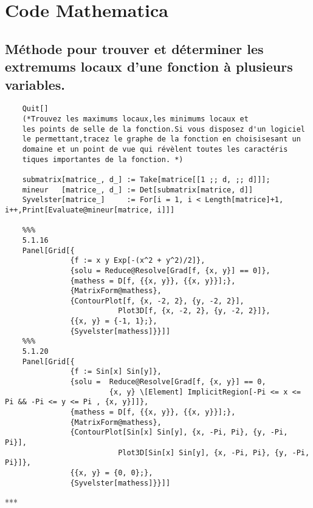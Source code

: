 \section{Code Mathematica}
\subsection{Méthode pour trouver et déterminer les extremums locaux d'une fonction à plusieurs variables.}
	\begin{verbatim}
	Quit[]
	(*Trouvez les maximums locaux,les minimums locaux et
	les points de selle de la fonction.Si vous disposez d'un logiciel
	le permettant,tracez le graphe de la fonction en choisisesant un 
	domaine et un point de vue qui révèlent toutes les caractéris­
	tiques importantes de la fonction. *)
	
	submatrix[matrice_, d_] := Take[matrice[[1 ;; d, ;; d]]];
	mineur   [matrice_, d_] := Det[submatrix[matrice, d]]	
	Syvelster[matrice_]     := For[i = 1, i < Length[matrice]+1, i++,Print[Evaluate@mineur[matrice, i]]]
	
	%%%
	5.1.16
	Panel[Grid[{
	           {f := x y Exp[-(x^2 + y^2)/2]},
	           {solu = Reduce@Resolve[Grad[f, {x, y}] == 0]},
	           {mathess = D[f, {{x, y}}, {{x, y}}];},
	           {MatrixForm@mathess},
	           {ContourPlot[f, {x, -2, 2}, {y, -2, 2}], 
	                      Plot3D[f, {x, -2, 2}, {y, -2, 2}]},
	           {{x, y} = {-1, 1};},
	           {Syvelster[mathess]}}]]
	%%%
	5.1.20
	Panel[Grid[{
	           {f := Sin[x] Sin[y]},
	           {solu =	Reduce@Resolve[Grad[f, {x, y}] == 0,
	           			{x, y} \[Element] ImplicitRegion[-Pi <= x <= Pi && -Pi <= y <= Pi , {x, y}]]},
	           {mathess = D[f, {{x, y}}, {{x, y}}];},
	           {MatrixForm@mathess},
	           {ContourPlot[Sin[x] Sin[y], {x, -Pi, Pi}, {y, -Pi, Pi}], 
	                      Plot3D[Sin[x] Sin[y], {x, -Pi, Pi}, {y, -Pi, Pi}]},
	           {{x, y} = {0, 0};},
	           {Syvelster[mathess]}}]]
	\end{verbatim}
	\begin{center}***\end{center}

